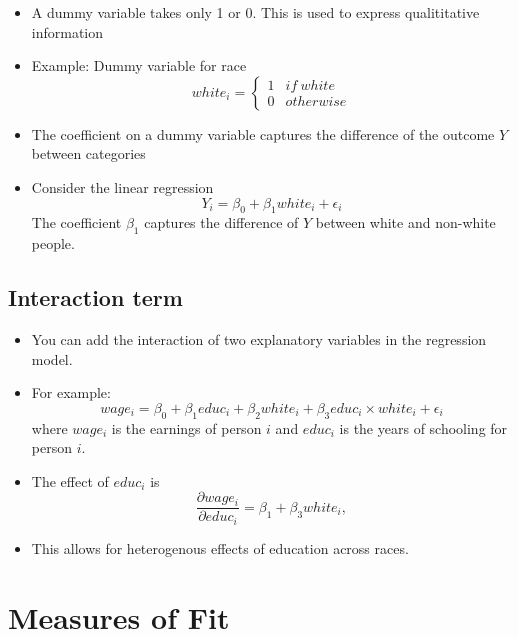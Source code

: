 \documentclass[]{book}
\providecommand{\tightlist}{%
  \setlength{\itemsep}{0pt}\setlength{\parskip}{0pt}}
\begin{document}
\begin{itemize}
\tightlist
\item
  A dummy variable takes only 1 or 0. This is used to express
  qualititative information
\item
  Example: Dummy variable for race \[
  white_{i}=\begin{cases}
  1 & if\ white\\
  0 & otherwise
  \end{cases} 
     \]
\item
  The coefficient on a dummy variable captures the difference of the
  outcome \(Y\) between categories
\item
  Consider the linear regression \[
  Y_i = \beta_0 + \beta_1 white_i + \epsilon_i
  \] The coefficient \(\beta_1\) captures the difference of \(Y\)
  between white and non-white people.
\end{itemize}

\subsection{Interaction term}\label{interaction-term}

\begin{itemize}
\tightlist
\item
  You can add the interaction of two explanatory variables in the
  regression model.
\item
  For example: \[
  wage_i = \beta_0 + \beta_1 educ_i + \beta_2 white_i + \beta_3 educ_i \times white_i + \epsilon_i
  \] where \(wage_i\) is the earnings of person \(i\) and \(educ_i\) is
  the years of schooling for person \(i\).
\item
  The effect of \(educ_i\) is \[
  \frac{\partial wage_i}{\partial educ_i} = \beta_1 + \beta_3 white_i,
  \]
\item
  This allows for heterogenous effects of education across races.
\end{itemize}

\section{Measures of Fit}\label{measures-of-fit}
\end{document}
